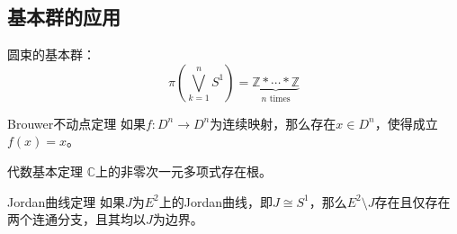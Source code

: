 \documentclass[lang = cn, scheme = chinese, thmcnt = section, usesamecnt]{elegantbook}
\newcommand{\C}{\mathbb{C}}  		   %
\newcommand{\Z}{\mathbb{Z}}            %
\begin{document}
\subsection{基本群的应用}

\begin{example}
	圆束的基本群：
	$$
	\pi\left(\bigvee_{k=1}^{n}S^1\right)=\underbrace{\Z*\cdots*\Z}_{n\text{ times}}
	$$
\end{example}

\begin{theorem}{Brouwer不动点定理}
	如果$f:D^n\to D^n$为连续映射，那么存在$x\in D^n$，使得成立$f(x)=x$。
\end{theorem}

\begin{theorem}{代数基本定理}
	$\C$上的非零次一元多项式存在根。
\end{theorem}

\begin{theorem}{Jordan曲线定理}
	如果$J$为$E^2$上的Jordan曲线，即$J\cong S^1$，那么$E^2\setminus J$存在且仅存在两个连通分支，且其均以$J$为边界。
\end{theorem}
\end{document}
